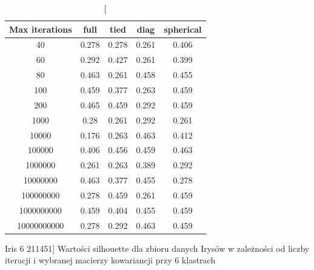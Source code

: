 \documentclass{classrep}
\begin{document}
{{\begin{table}[!htbp]
                \begin{minipage}{1\textwidth}
                \centering
                \begin{tabular}{|c|c|c|c|c|}
                \hline
                Max iterations & full & tied & diag & spherical \\ \hline
                40 & 0.278 & 0.278 & 0.261 & 0.406 \\ \hline
                60 & 0.292 & 0.427 & 0.261 & 0.399 \\ \hline
                80 & 0.463 & 0.261 & 0.458 & 0.455 \\ \hline
                100 & 0.459 & 0.377 & 0.263 & 0.459 \\ \hline
                200 & 0.465 & 0.459 & 0.292 & 0.459 \\ \hline
                1000 & 0.28 & 0.261 & 0.292 & 0.261 \\ \hline
                10000 & 0.176 & 0.263 & 0.463 & 0.412 \\ \hline
                100000 & 0.406 & 0.456 & 0.459 & 0.463 \\ \hline
                1000000 & 0.261 & 0.263 & 0.389 & 0.292 \\ \hline
                10000000 & 0.463 & 0.377 & 0.455 & 0.278 \\ \hline
                100000000 & 0.278 & 0.459 & 0.261 & 0.459 \\ \hline
                1000000000 & 0.459 & 0.404 & 0.455 & 0.459 \\ \hline
                10000000000 & 0.278 & 0.292 & 0.463 & 0.459 \\ \hline
                \end{tabular}
                \caption
                [Iris 6 211451]
                {Wartości silhouette dla zbioru danych Irysów w zależności od liczby
                iteracji i wybranej macierzy kowariancji przy 6 klastrach}
                \label{Iris_6_211451}
                \end{minipage}
                \hfill
                

\end{table}}}
\end{document}
